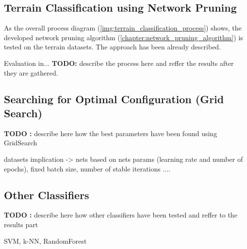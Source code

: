 \subsection{Terrain Classification using Network Pruning} \label{ssec:pruned_net_on_terrains}
As the overall process diagram (\cref{img:terrain_classification_process}) shows, the developed network pruning algorithm (\cref{chapter:network_pruning_algorithm}) is tested on the terrain datasets. The approach has been already described. 

Evaluation in... \textbf{TODO:} describe the process here and reffer the results after they are gathered.


\subsection{Searching for Optimal Configuration (Grid Search)} \label{ssec:grid_search}
\textbf{TODO :} describe here how the best parameters have been found using GridSearch

datasets implication -> nets based on nets params (learning rate and number of epochs), fixed batch size, number of stable iterations ....

\subsection{Other Classifiers} \label{ssec:other_classifiers}
\textbf{TODO :} describe here how other classifiers have been tested and reffer to the results part

SVM, k-NN, RandomForest